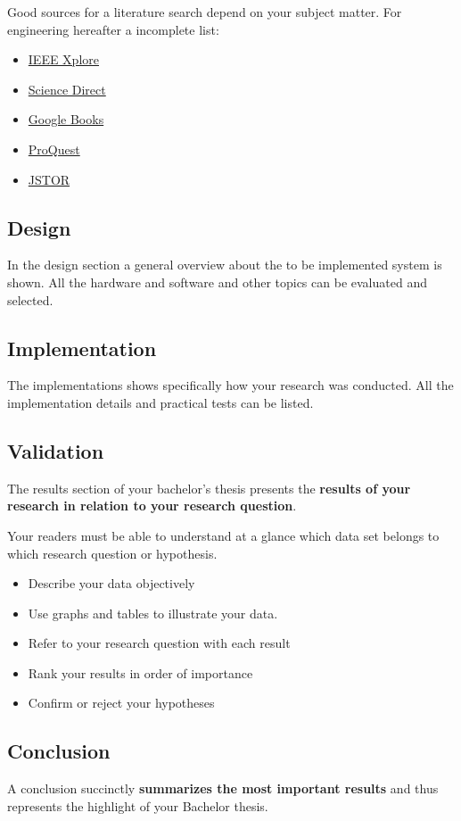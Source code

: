 \documentclass[a4paper,11pt,fleqn]{book}
\begin{document}
Good sources for a literature search depend on your subject matter. For engineering hereafter a incomplete list:
\begin{itemize}
  \item \href{https://ieeexplore.ieee.org/Xplore/home.jsp}{IEEE Xplore}
  \item \href{https://www.sciencedirect.com/}{Science Direct}
  \item \href{https://books.google.com/}{Google Books}
  \item \href{https://www.proquest.com/}{ProQuest}
  \item \href{https://www.jstor.org/}{JSTOR}
\end{itemize}

\subsection{Design}
In the design section a general overview about the to be implemented system is shown. All the hardware and software and other topics can be evaluated and selected.

\subsection{Implementation}
The implementations shows specifically how your research was conducted. All the implementation details and practical tests can be listed.

\subsection{Validation}
The results section of your bachelor's thesis presents the \textbf{results of your research in relation to your research question}.

Your readers must be able to understand at a glance which data set belongs to which research question or hypothesis.
\begin{itemize}
  \item Describe your data objectively
  \item Use graphs and tables to illustrate your data.
  \item Refer to your research question with each result
  \item Rank your results in order of importance
  \item Confirm or reject your hypotheses
\end{itemize}

\subsection{Conclusion}
A conclusion succinctly \textbf{summarizes the most important results} and thus represents the highlight of your Bachelor thesis.
\end{document}
